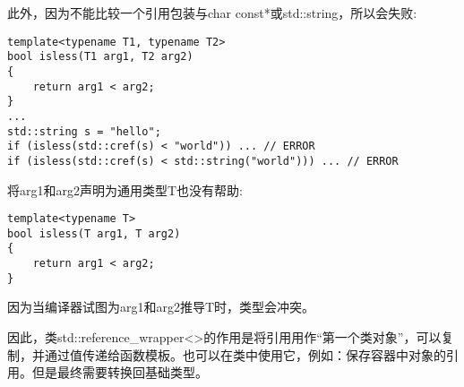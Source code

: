 此外，因为不能比较一个引用包装与char const*或std::string，所以会失败:

\begin{lstlisting}[style=styleCXX]
template<typename T1, typename T2>
bool isless(T1 arg1, T2 arg2)
{
	return arg1 < arg2;
}
...
std::string s = "hello";
if (isless(std::cref(s) < "world")) ... // ERROR
if (isless(std::cref(s) < std::string("world"))) ... // ERROR
\end{lstlisting}

将arg1和arg2声明为通用类型T也没有帮助:

\begin{lstlisting}[style=styleCXX]
template<typename T>
bool isless(T arg1, T arg2)
{
	return arg1 < arg2;
}
\end{lstlisting}

因为当编译器试图为arg1和arg2推导T时，类型会冲突。

因此，类std::reference\_wrapper<>的作用是将引用用作“第一个类对象”，可以复制，并通过值传递给函数模板。也可以在类中使用它，例如：保存容器中对象的引用。但是最终需要转换回基础类型。











